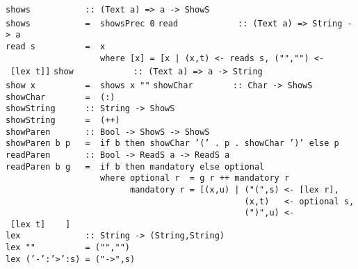 \mbox{\tt shows\ \ \ \ \ \ \ \ \ \ \ ::\ (Text\ a)\ =>\ a\ ->\ ShowS}\\
\mbox{\tt shows\ \ \ \ \ \ \ \ \ \ \ =\ \ showsPrec\ 0}
%
\eprogB\noindent\bprogB
\mbox{\tt read\ \ \ \ \ \ \ \ \ \ \ \ ::\ (Text\ a)\ =>\ String\ ->\ a}\\
\mbox{\tt read\ s\ \ \ \ \ \ \ \ \ \ =\ \ x}\\
\mbox{\tt \ \ \ \ \ \ \ \ \ \ \ \ \ \ \ \ \ \ \ where\ [x]\ =\ [x\ |\ (x,t)\ <-\ reads\ s,\ ("","")\ <-\ [lex\ t]]}
%
\eprogB\noindent\bprogB
\mbox{\tt show\ \ \ \ \ \ \ \ \ \ \ \ ::\ (Text\ a)\ =>\ a\ ->\ String}\\
\mbox{\tt show\ x\ \ \ \ \ \ \ \ \ \ =\ \ shows\ x\ ""}
%
\eprogB\noindent\bprogB
\mbox{\tt showChar\ \ \ \ \ \ \ \ ::\ Char\ ->\ ShowS}\\
\mbox{\tt showChar\ \ \ \ \ \ \ \ =\ \ (:)}\\
\mbox{\tt showString\ \ \ \ \ \ ::\ String\ ->\ ShowS}\\
\mbox{\tt showString\ \ \ \ \ \ =\ \ (++)}\\
\mbox{\tt showParen\ \ \ \ \ \ \ ::\ Bool\ ->\ ShowS\ ->\ ShowS}\\
\mbox{\tt showParen\ b\ p\ \ \ =\ \ if\ b\ then\ showChar\ '('\ .\ p\ .\ showChar\ ')'\ else\ p}
%
%
%
\eprogB\noindent\bprogB
\mbox{\tt readParen\ \ \ \ \ \ \ ::\ Bool\ ->\ ReadS\ a\ ->\ ReadS\ a}\\
\mbox{\tt readParen\ b\ g\ \ \ =\ \ if\ b\ then\ mandatory\ else\ optional}\\
\mbox{\tt \ \ \ \ \ \ \ \ \ \ \ \ \ \ \ \ \ \ \ where\ optional\ r\ \ =\ g\ r\ ++\ mandatory\ r}\\
\mbox{\tt \ \ \ \ \ \ \ \ \ \ \ \ \ \ \ \ \ \ \ \ \ \ \ \ \ mandatory\ r\ =\ [(x,u)\ |\ ("(",s)\ <-\ [lex\ r],}\\
\mbox{\tt \ \ \ \ \ \ \ \ \ \ \ \ \ \ \ \ \ \ \ \ \ \ \ \ \ \ \ \ \ \ \ \ \ \ \ \ \ \ \ \ \ \ \ \ \ \ \ \ (x,t)\ \ \ <-\ optional\ s,}\\
\mbox{\tt \ \ \ \ \ \ \ \ \ \ \ \ \ \ \ \ \ \ \ \ \ \ \ \ \ \ \ \ \ \ \ \ \ \ \ \ \ \ \ \ \ \ \ \ \ \ \ \ (")",u)\ <-\ [lex\ t]\ \ \ \ ]}\\
\mbox{\tt lex\ \ \ \ \ \ \ \ \ \ \ \ \ ::\ String\ ->\ (String,String)}\\
\mbox{\tt lex\ ""\ \ \ \ \ \ \ \ \ \ =\ ("","")}\\
\mbox{\tt lex\ ('-':'>':s)\ =\ ("->",s)}\\
